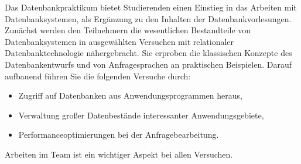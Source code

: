 \begin{course}
\begin{learningoutcomes}
\end{learningoutcomes}

\begin{content}
Das Datenbankpraktikum bietet Studierenden einen Einstieg in das Arbeiten mit Datenbanksystemen, als Ergänzung zu den Inhalten der Datenbankvorlesungen. Zunächst werden den Teilnehmern die wesentlichen Bestandteile von Datenbanksystemen in ausgewählten Versuchen mit relationaler Datenbanktechnologie nähergebracht. Sie erproben die klassischen Konzepte des Datenbankentwurfs und von Anfragesprachen an praktischen Beispielen. Darauf aufbauend führen Sie die folgenden Versuche durch:

 \begin{itemize}\item Zugriff auf Datenbanken aus Anwendungsprogrammen heraus,  \item Verwaltung großer Datenbestände interessanter Anwendungsgebiete,  \item Performanceoptimierungen bei der Anfragebearbeitung.  \end{itemize}

Arbeiten im Team ist ein wichtiger Aspekt bei allen Versuchen.


\end{content}







\end{course}